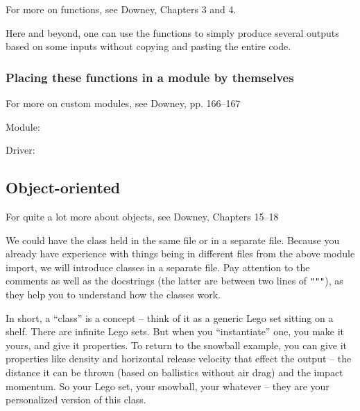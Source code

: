 \documentclass[a4paper,10pt]{scrartcl}
\begin{document}
\begin{framed}
For more on functions, see Downey, Chapters 3 and 4.
\end{framed}

Here and beyond, one can use the functions to simply produce several outputs based on some inputs without copying and pasting the entire code.



\subsubsection{Placing these functions in a module by themselves}

\begin{framed}
For more on custom modules, see Downey, pp. 166--167
\end{framed}

Module:


Driver:


\subsection{Object-oriented}

\begin{framed}
For quite a lot more about objects, see Downey, Chapters 15--18
\end{framed}

We could have the class held in the same file or in a separate file. Because you already have experience with things being in different files from the above module import, we will introduce classes in a separate file. Pay attention to the comments as well as the docstrings (the latter are between two lines of \lstinline{"""}), as they help you to understand how the classes work.

In short, a ``class'' is a concept -- think of it as a generic Lego set sitting on a shelf. There are infinite Lego sets. But when you ``instantiate'' one, you make it yours, and give it properties. To return to the snowball example, you can give it properties like density and horizontal release velocity that effect the output -- the distance it can be thrown (based on ballistics without air drag) and the impact momentum. So your Lego set, your snowball, your whatever -- they are your personalized version of this class.
\end{document}
